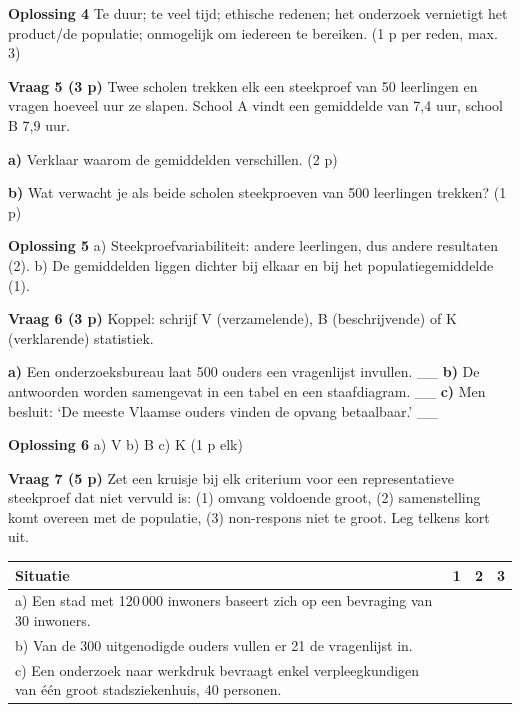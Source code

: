 \begin{oplossing}
\textbf{Oplossing 4} \quad Te duur; te veel tijd; ethische redenen; het onderzoek vernietigt het product/de populatie; onmogelijk om iedereen te bereiken. (1 p per reden, max. 3)
\end{oplossing}

\textbf{Vraag 5 \quad (3 p)} Twee scholen trekken elk een steekproef van 50 leerlingen en vragen hoeveel uur ze slapen. School A vindt een gemiddelde van 7,4 uur, school B 7,9 uur.

\textbf{a)} Verklaar waarom de gemiddelden verschillen. (2 p) \lijn

\textbf{b)} Wat verwacht je als beide scholen steekproeven van 500 leerlingen trekken? (1 p) \lijn

\begin{oplossing}
\textbf{Oplossing 5} \quad a) Steekproefvariabiliteit: andere leerlingen, dus andere resultaten (2). b) De gemiddelden liggen dichter bij elkaar en bij het populatiegemiddelde (1).
\end{oplossing}

\textbf{Vraag 6 \quad (3 p)} Koppel: schrijf V (verzamelende), B (beschrijvende) of K (verklarende) statistiek.

\textbf{a)} Een onderzoeksbureau laat 500 ouders een vragenlijst invullen. \_\_ \quad \textbf{b)} De antwoorden worden samengevat in een tabel en een staafdiagram. \_\_ \quad \textbf{c)} Men besluit: ‘De meeste Vlaamse ouders vinden de opvang betaalbaar.’ \_\_

\begin{oplossing}
\textbf{Oplossing 6} \quad a) V \quad b) B \quad c) K (1 p elk)
\end{oplossing}

\textbf{Vraag 7 \quad (5 p)} Zet een kruisje bij elk criterium voor een representatieve steekproef dat niet vervuld is: (1) omvang voldoende groot, (2) samenstelling komt overeen met de populatie, (3) non-respons niet te groot. Leg telkens kort uit.

\begin{tabular}{llll}
\hline
Situatie & 1 & 2 & 3 \\
\hline
a) Een stad met 120\,000 inwoners baseert zich op een bevraging van 30 inwoners. & & & \\
b) Van de 300 uitgenodigde ouders vullen er 21 de vragenlijst in. & & & \\
c) Een onderzoek naar werkdruk bevraagt enkel verpleegkundigen van één groot stadsziekenhuis, 40 personen. & & & \\
\hline
\end{tabular}

